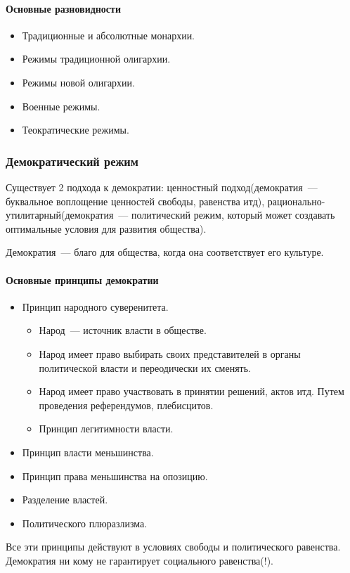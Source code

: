 \paragraph{Основные разновидности}
\begin{itemize}
	\item Традиционные и абсолютные монархии.
	\item Режимы традиционной олигархии.
	\item Режимы новой олигархии.
	\item Военные режимы.
	\item Теократические режимы.
\end{itemize}

\subsubsection{Демократический режим}
Существует 2 подхода к демократии: ценностный подход(демократия~--- буквальное воплощение ценностей свободы, равенства итд), рационально-утилитарный(демократия~--- политический режим, который может создавать оптимальные условия для развития общества).

Демократия~--- благо для общества, когда она соответствует его культуре.

\paragraph{Основные принципы демократии}
\begin{itemize}
	\item Принцип народного суверенитета.
	\begin{itemize}
		\item Народ~--- источник власти в обществе.
		\item Народ имеет право выбирать своих представителей в органы политической власти и переодически их сменять.
		\item Народ имеет право участвовать в принятии решений, актов итд. Путем проведения референдумов, плебисцитов.
		\item Принцип легитимности власти.
	\end{itemize}
	\item Принцип власти меньшинства.
	\item Принцип права меньшинства на опозицию.
	\item Разделение властей.
	\item Политического плюразлизма.
\end{itemize}
Все эти принципы действуют в условиях свободы и политического равенства. Демократия ни кому не гарантирует социального равенства(!).

